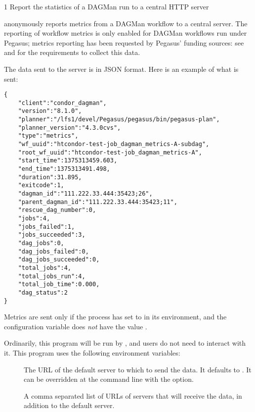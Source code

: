 \begin{ManPage}{\label{man-condor-dagman-metrics-reporter}}{1}
{Report the statistics of a DAGMan run to a central HTTP server}


\Synopsis {}

\Description

 anonymously reports metrics from
a DAGMan workflow to a central server.  The reporting of workflow metrics
is only enabled for DAGMan workflows run under Pegasus; metrics reporting
has been requested by Pegasus' funding sources:
see 
and 
for the requirements to collect this data.

The data sent to the server is in JSON format.  
Here is an example of what is sent:
\begin{verbatim}
{
    "client":"condor_dagman",
    "version":"8.1.0",
    "planner":"/lfs1/devel/Pegasus/pegasus/bin/pegasus-plan",
    "planner_version":"4.3.0cvs",
    "type":"metrics",
    "wf_uuid":"htcondor-test-job_dagman_metrics-A-subdag",
    "root_wf_uuid":"htcondor-test-job_dagman_metrics-A",
    "start_time":1375313459.603,
    "end_time":1375313491.498,
    "duration":31.895,
    "exitcode":1,
    "dagman_id":"111.222.33.444:35423;26",
    "parent_dagman_id":"111.222.33.444:35423;11",
    "rescue_dag_number":0,
    "jobs":4,
    "jobs_failed":1,
    "jobs_succeeded":3,
    "dag_jobs":0,
    "dag_jobs_failed":0,
    "dag_jobs_succeeded":0,
    "total_jobs":4,
    "total_jobs_run":4,
    "total_job_time":0.000,
    "dag_status":2
}
\end{verbatim}

Metrics are sent only if the  process has
 set to  in its environment,
and the  configuration variable does \emph{not}
have the value .

Ordinarily, this program will be run by , 
and users do not need to interact with it.
This program uses the following environment variables:
\begin{description}
  \item[]
    The URL of the default server to which to send the data.
    It defaults to .
    It can be overridden at the command line with the  option.
  \item[]
    A comma separated list of URLs of servers that will receive the
    data, in addition to the default server. 
\end{description}


\end{ManPage}
